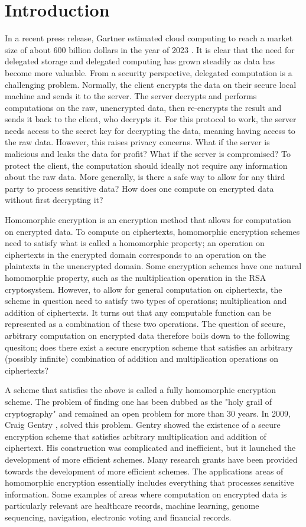 \chapter{Introduction}

In a recent press release, Gartner estimated cloud computing to reach a market size of about 600 billion dollars in the year of 2023 \cite{Gartner2023}. It is clear that the need for delegated storage and delegated computing has grown steadily as data has become more valuable. From a security perspective, delegated computation is a challenging problem. Normally, the client encrypts the data on their secure local machine and sends it to the server. The server decrypts and performs computations on the raw, unencrypted data, then re-encrypts the result and sends it back to the client, who decrypts it. For this protocol to work, the server needs access to the secret key for decrypting the data, meaning having access to the raw data. However, this raises privacy concerns. What if the server is malicious and leaks the data for profit? What if the server is compromised? To protect the client, the computation should ideally not require any information about the raw data. More generally, is there a safe way to allow for any third party to process sensitive data? How does one compute on encrypted data without first decrypting it?

Homomorphic encryption is an encryption method that allows for computation on encrypted data. To compute on ciphertexts, homomorphic encryption schemes need to satisfy what is called a homomorphic property; an operation on ciphertexts in the encrypted domain corresponds to an operation on the plaintexts in the unencrypted domain. Some encryption schemes have one natural homomorphic property, such as the multiplication operation in the RSA cryptosystem. However, to allow for general computation on ciphertexts, the scheme in question need to satisfy two types of operations; multiplication and addition of ciphertexts. It turns out that any computable function can be represented as a combination of these two operations. The question of secure, arbitrary computation on encrypted data therefore boils down to the following quesiton; does there exist a secure encryption scheme that satisfies an arbitrary (possibly infinite) combination of addition and multiplication operations on ciphertexts? 

A scheme that satisfies the above is called a fully homomorphic encryption scheme. The problem of finding one has been dubbed as the "holy grail of cryptography" and remained an open problem for more than 30 years. In 2009, Craig Gentry \cite{Gentry-Thesis}, solved this problem. Gentry showed the existence of a secure encryption scheme that satisfies arbitrary multiplication and addition of ciphertext. His construction was complicated and inefficient, but it launched the development of more efficient schemes. Many research grants have been provided towards the development of more efficient schemes. The applications areas of homomorphic encryption essentially includes everything that processes sensitive information. Some examples of areas where computation on encrypted data is particularly relevant are healthcare records, machine learning, genome sequencing, navigation, electronic voting and financial records.